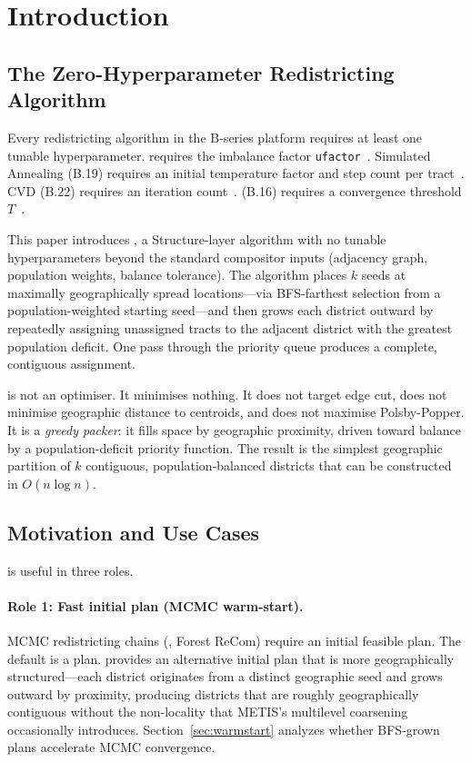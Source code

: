 \section{Introduction}
\label{sec:introduction}

\subsection{The Zero-Hyperparameter Redistricting Algorithm}

Every redistricting algorithm in the B-series platform requires at
least one tunable hyperparameter.
\metis{} requires the imbalance factor \texttt{ufactor}~\citep{karypis1998}.
Simulated Annealing (B.19) requires an initial temperature factor and
step count per tract~\citep{b19paper}.
CVD (B.22) requires an iteration count~\citep{b22paper}.
\cs{} (B.16) requires a convergence threshold $T$~\citep{b16paper}.

This paper introduces \bfsg{}, a Structure-layer algorithm with no
tunable hyperparameters beyond the standard compositor inputs
(adjacency graph, population weights, balance tolerance).
The algorithm places $k$ seeds at maximally geographically spread
locations---via BFS-farthest selection from a population-weighted
starting seed---and then grows each district outward by repeatedly
assigning unassigned tracts to the adjacent district with the greatest
population deficit.
One pass through the priority queue produces a complete, contiguous
assignment.

\bfsg{} is not an optimiser.
It minimises nothing.
It does not target edge cut, does not minimise geographic distance to
centroids, and does not maximise Polsby-Popper.
It is a \emph{greedy packer}: it fills space by geographic proximity,
driven toward balance by a population-deficit priority function.
The result is the simplest geographic partition of $k$ contiguous,
population-balanced districts that can be constructed in $O(n \log n)$.

\subsection{Motivation and Use Cases}

\bfsg{} is useful in three roles.

\paragraph{Role 1: Fast initial plan (MCMC warm-start).}
MCMC redistricting chains (\recom{}, Forest ReCom) require an initial
feasible plan.
The default is a \metis{} plan.
\bfsg{} provides an alternative initial plan that is more geographically
structured---each district originates from a distinct geographic seed and
grows outward by proximity, producing districts that are roughly
geographically contiguous without the non-locality that METIS's multilevel
coarsening occasionally introduces.
Section~\ref{sec:warmstart} analyzes whether BFS-grown plans accelerate
MCMC convergence.

